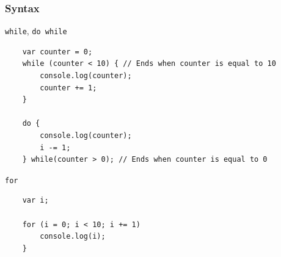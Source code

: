 \begin{frame}[fragile]
  \frametitle{Syntax}

  \begin{block}{\texttt{while}, \texttt{do while}}
    \scriptsize{
    \begin{verbatim}
    var counter = 0;
    while (counter < 10) { // Ends when counter is equal to 10
        console.log(counter);
        counter += 1;
    }

    do {
        console.log(counter);
        i -= 1;
    } while(counter > 0); // Ends when counter is equal to 0
    \end{verbatim}
    }
  \end{block}

  \pause

  \begin{block}{\texttt{for}}
    {\scriptsize
    \begin{verbatim}
    var i;

    for (i = 0; i < 10; i += 1)
        console.log(i);
    }
    \end{verbatim}
    }
  \end{block}
\end{frame}

